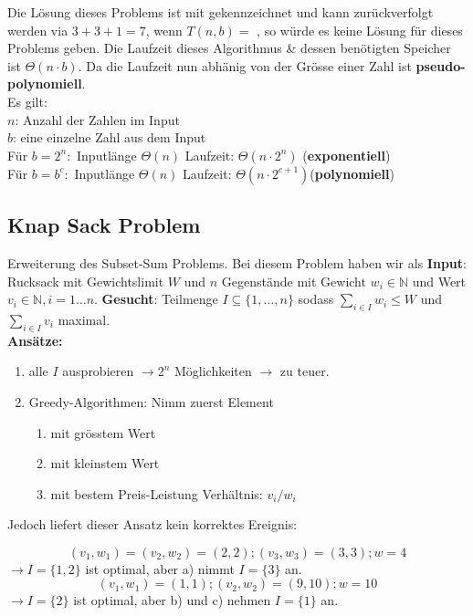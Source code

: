 \documentclass[a4paper]{article}
\newcommand*\circled[1]{\tikz[baseline=(char.base)]{
            \node[shape=circle,draw,inner sep=1.2pt] (char) {#1};}}
\begin{document}
Die Lösung dieses Problems ist mit \textcolor{red}{\circled{1}} gekennzeichnet und kann zurückverfolgt werden via $3 + 3 + 1 = 7$, wenn $T(n,b) =$ \textcolor{red}{\circled{0}}, so würde es keine Lösung für dieses Problems geben. 
Die Laufzeit dieses Algorithmus \& dessen benötigten Speicher ist $\Theta(n\cdot b)$. Da die Laufzeit nun abhänig von der Grösse einer Zahl ist \textbf{pseudo-polynomiell}. \\
Es gilt: \\ 
$n$: Anzahl der Zahlen im Input \\
$b$: eine einzelne Zahl aus dem Input\\
Für $b= 2^n: $ Inputlänge $\Theta(n)$ Laufzeit: $\Theta(n\cdot2^n)$ (\textbf{exponentiell}) \\
Für $b= b^c: $ Inputlänge $\Theta(n)$ Laufzeit: $\Theta(n\cdot2^{c+1})$(\textbf{polynomiell})

\subsection{Knap Sack Problem}
Erweiterung des Subset-Sum Problems. Bei diesem Problem haben wir als \textbf{Input}: Rucksack mit Gewichtslimit $W$ und $n$ Gegenstände mit Gewicht $w_i \in \mathbb{N}$ und Wert $v_i \in \mathbb{N}, i = 1\dots n$. \textbf{Gesucht}: Teilmenge $I \subseteq \lbrace 1,\dots ,n \rbrace$ sodass $\sum_{i\in I} w_i \leq W$ und $\sum_{i\in I} v_i$ maximal. \\ 
\textbf{Ansätze:} 
\begin{enumerate}
    \item alle $I$ ausprobieren $\rightarrow 2^n$ Möglichkeiten $\rightarrow$ zu teuer.
    \item Greedy-Algorithmen: Nimm zuerst Element 
    \begin{enumerate}
        \item mit grösstem Wert
        \item mit kleinstem Wert
        \item mit bestem Preis-Leistung Verhältnis: $v_i /w_i$
    \end{enumerate}
\end{enumerate}
Jedoch liefert dieser Ansatz kein korrektes Ereignis:

\begin{equation*}
    (v_1,w_1) = (v_2,w_2) = (2,2) ; (v_3,w_3) = (3,3) ; w = 4
\end{equation*}
$\rightarrow I = \lbrace 1,2\rbrace$ ist optimal, aber a) nimmt $I = \lbrace 3\rbrace$ an.
\begin{equation*}
    (v_1,w_1) = (1,1) ; (v_2,w_2) = (9,10) ; w = 10
\end{equation*}
$\rightarrow I = \lbrace 2\rbrace$ ist optimal, aber b) und c) nehmen $I = \lbrace 1\rbrace$ an.
\end{document}
